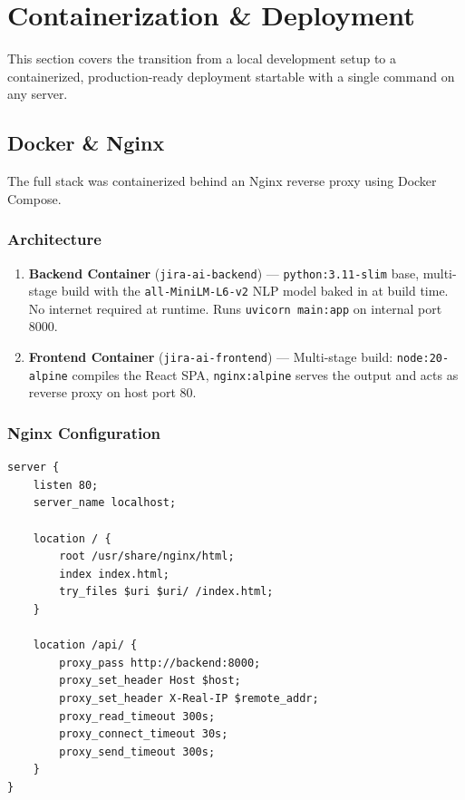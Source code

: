 \documentclass[12pt, a4paper]{article}
\begin{document}
\section{Containerization \& Deployment}

This section covers the transition from a local development setup to a containerized, production-ready deployment startable with a single command on any server.

\subsection{Docker \& Nginx}

The full stack was containerized behind an Nginx reverse proxy using Docker Compose.

\subsubsection{Architecture}

\begin{enumerate}
    \item \textbf{Backend Container} (\texttt{jira-ai-backend}) — \texttt{python:3.11-slim} base, multi-stage build with the \texttt{all-MiniLM-L6-v2} NLP model baked in at build time. No internet required at runtime. Runs \texttt{uvicorn main:app} on internal port 8000.

    \item \textbf{Frontend Container} (\texttt{jira-ai-frontend}) — Multi-stage build: \texttt{node:20-alpine} compiles the React SPA, \texttt{nginx:alpine} serves the output and acts as reverse proxy on host port 80.
\end{enumerate}

\subsubsection{Nginx Configuration}

\begin{lstlisting}[caption={nginx.conf — Reverse proxy configuration}]
server {
    listen 80;
    server_name localhost;

    location / {
        root /usr/share/nginx/html;
        index index.html;
        try_files $uri $uri/ /index.html;
    }

    location /api/ {
        proxy_pass http://backend:8000;
        proxy_set_header Host $host;
        proxy_set_header X-Real-IP $remote_addr;
        proxy_read_timeout 300s;
        proxy_connect_timeout 30s;
        proxy_send_timeout 300s;
    }
}
\end{lstlisting}
\end{document}
